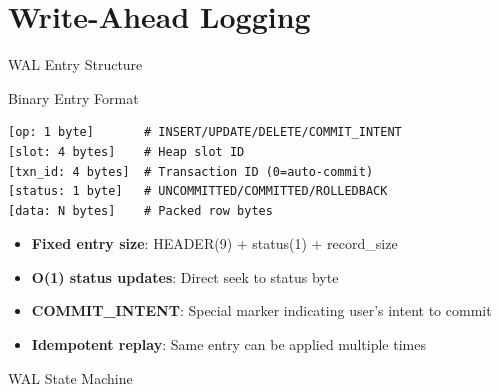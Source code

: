 \documentclass[aspectratio=169]{beamer}
\begin{document}
\section{Write-Ahead Logging}

\begin{frame}[fragile]{WAL Entry Structure}
\begin{block}{Binary Entry Format}
\begin{lstlisting}
[op: 1 byte]       # INSERT/UPDATE/DELETE/COMMIT_INTENT
[slot: 4 bytes]    # Heap slot ID
[txn_id: 4 bytes]  # Transaction ID (0=auto-commit)
[status: 1 byte]   # UNCOMMITTED/COMMITTED/ROLLEDBACK
[data: N bytes]    # Packed row bytes
\end{lstlisting}
\end{block}

\begin{itemize}
  \item \textbf{Fixed entry size}: HEADER(9) + status(1) + record\_size
  \item \textbf{O(1) status updates}: Direct seek to status byte
  \item \textbf{COMMIT\_INTENT}: Special marker indicating user's intent to commit
  \item \textbf{Idempotent replay}: Same entry can be applied multiple times
\end{itemize}
\end{frame}

\begin{frame}{WAL State Machine}
\begin{center}
\end{center}
\end{frame}
\end{document}
